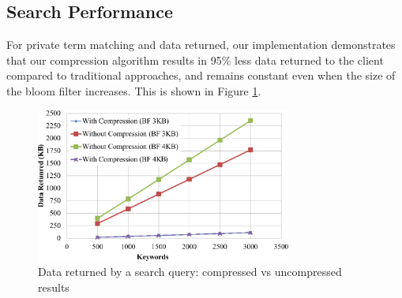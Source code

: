 \subsection{Search Performance}

For private term matching and data returned, our implementation demonstrates
that our compression algorithm results in 95\% less data returned to the client
compared to traditional approaches, and remains constant even when the size
of the bloom filter increases. This is shown in Figure \ref{fig:compress}.

\begin{figure}[h!]
  \centering
  \includegraphics[width=3.3in]{figures/comp_compare.png}
  \vspace{-10px}
  \caption{Data returned by a search query: compressed vs uncompressed results}
  \vspace{-5px}

  \label{fig:compress}
\end{figure}


%

